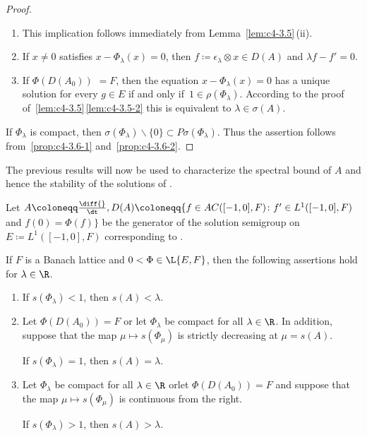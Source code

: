 \begin{proof}
\begin{enumerate}[\upshape (i), wide, labelindent=.25em] 
\item 
This implication follows immediately from Lemma~\ref{lem:c4-3.5}\,(ii).

\item 
If\/ $x \neq 0$ satisfies $x - \Phi_{\lambda}(x) = 0$, then $f \coloneq  \epsilon_{\lambda} \otimes x \in D(A)$ and $\lambda f - f' = 0$.

\item 
If\/ $\Phi(D(A_{0}))$ $= F$,  then the equation $x - \Phi_{\lambda}(x) = 0$ has a
unique solution for every $g \in E$ if and only if\, $1 \in \rho(\Phi_{\lambda})$. 
According to the proof of~\ref{lem:c4-3.5}\,\ref{lem:c4-3.5-2} this is equivalent to $\lambda \in \sigma(A)$.
\end{enumerate}
If\/ $\Phi_{\lambda}$ is compact, then $\sigma(\Phi_{\lambda})\backslash\{0\} \subset P\sigma(\Phi_{\lambda})$. Thus the assertion follows from~\ref{prop:c4-3.6-1} and~\ref{prop:c4-3.6-2}.
\end{proof}
The previous results will now be used to characterize the spectral bound of\/ $A$ and hence the stability of the solutions of .
\begin{theorem}\label{thm:c4-3.7}
Let $A \coloneqq \frac{\diff{}}{\dt}, D(A) \coloneqq \{f \in AC([-1,0],F) \colon f' \in L^{1}([-1,0],F)$ and $f(0) = \Phi(f)\}$ be the generator of the solution semigroup on $E \coloneqq L^{1}([-1,0],F)$ corresponding to . 

If\/ $F$ is a Banach lattice and $0 < \Phi \in \L{E,F}$, then the following assertions hold for $\lambda \in \R$.
\begin{enumerate}[\upshape (i)]
\item \label{thm:c4-3.7-1}
If\/ $s(\Phi_{\lambda}) < 1$, then $s(A) < \lambda$.
\item \label{thm:c4-3.7-2}
Let $\Phi(D(A_{0})) = F$ or let $\Phi_{\lambda}$ be compact for all $\lambda \in \R$. 
In addition, suppose that the map $\mu \mapsto s(\Phi_\mu)$ is strictly decreasing at $\mu = s(A)$. 

If\/ $s(\Phi_{\lambda}) = 1$, then $s(A) = \lambda$.
\item \label{thm:c4-3.7-3}
Let $\Phi_{\lambda}$ be compact for all $\lambda \in \R$ \quad or\quad let $\Phi(D(A_{0})) = F$ and suppose that the map $\mu \mapsto s(\Phi_\mu)$ is continuous from the right. 

If\/ $s(\Phi_{\lambda}) > 1$, then $s(A) > \lambda$.
\end{enumerate}
\end{theorem}
